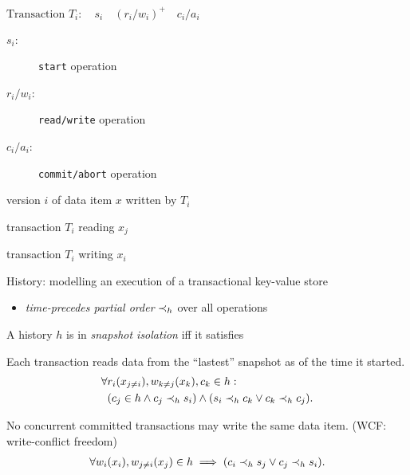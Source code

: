 \begin{frame}{}
  $\text{Transaction } T_i:\quad s_i\quad (r_i/w_i)^{+}\quad c_i/a_i$

  \begin{description}
    \item[$s_i$:] \texttt{start} operation
    \item[$r_i/w_i$:] \texttt{read/write} operation
    \item[$c_i/a_i$:] \texttt{commit/abort} operation
  \end{description}

  \pause
  \vspace{0.20cm}
  \begin{description}[$w_i(x_i)$:]
    \item[$x_i$:] version $i$ of data item $x$ written by $T_i$
    \item[$r_i(x_j)$:] transaction $T_i$ reading $x_j$
    \item[$w_i(x_i)$:] transaction $T_i$ writing $x_i$
  \end{description}

  \pause
  \vspace{0.80cm}
  History: modelling an execution of a transactional key-value store
  \begin{itemize}
    \item \emph{time-precedes partial order} $\prec_{h}$ over all operations
  \end{itemize}
\end{frame}

\begin{frame}{}
  A history $h$ is in \emph{\large snapshot isolation} iff it satisfies  \\[0.20cm]
  \begin{description}
    \item[Snapshot Read:] %
      Each transaction reads data from the ``lastest'' snapshot as of the time it started.
      \begin{align*}
	\forall &r_i(x_{j \neq i}), w_{k \neq j}(x_k), c_k \in h: \\
	& (c_j \in h \land c_j \prec_{h} s_i)
	 \land (s_i \prec_{h} c_k \lor c_k \prec_{h} c_j).
      \end{align*}
    \pause
    \item[Snapshot Write:] No concurrent committed transactions may write the same data item. (WCF: write-conflict freedom)
      \begin{align*}
	\forall w_i(x_i), w_{j \neq i}(x_j) \in h \implies (c_i \prec_{h} s_j \lor c_j \prec_{h} s_i).
      \end{align*}
  \end{description}
\end{frame}
